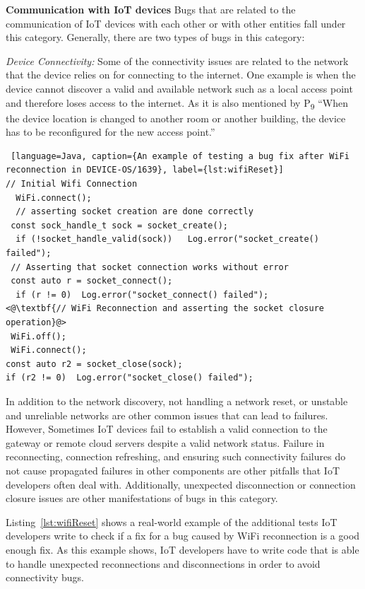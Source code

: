 \textbf{Communication with IoT devices}
Bugs that are related to the communication of IoT devices with each other or with other entities fall under this category. Generally, there are two types of bugs in this category:

\textit{Device Connectivity:} 
Some of the connectivity issues are related to the network that the device relies on for connecting to the internet. One example is when the device cannot discover a valid and available network such as a local access point and therefore loses access to the internet. As it is also mentioned by P\textsubscript{9} \enquote{When the device location is changed to another room or another building, the device has to be reconfigured for the new access point.}

\begin{lstlisting} [language=Java, caption={An example of testing a bug fix after WiFi reconnection in DEVICE-OS/1639}, label={lst:wifiReset}] 
// Initial Wifi Connection
  WiFi.connect();
  // asserting socket creation are done correctly
 const sock_handle_t sock = socket_create();
  if (!socket_handle_valid(sock))   Log.error("socket_create() failed");
 // Asserting that socket connection works without error
 const auto r = socket_connect();
  if (r != 0)  Log.error("socket_connect() failed");
<@\textbf{// WiFi Reconnection and asserting the socket closure operation}@>
 WiFi.off();
 WiFi.connect();
const auto r2 = socket_close(sock);
if (r2 != 0)  Log.error("socket_close() failed");
\end{lstlisting}

 
In addition to the network discovery, not handling a network reset, or unstable and unreliable networks are other common issues that can lead to failures. However, Sometimes IoT devices fail to establish a valid connection to the gateway or remote cloud servers despite a valid network status. Failure in reconnecting, connection refreshing, and ensuring such connectivity failures do not cause propagated failures in other components are other pitfalls that IoT developers often deal with. Additionally, unexpected disconnection or connection closure issues are other manifestations of bugs in this category.

Listing~\autoref{lst:wifiReset} shows a real-world example of the additional tests IoT developers write to check if a fix for a bug caused by WiFi reconnection is a good enough fix. As this example shows, IoT developers have to write code that is able to handle unexpected reconnections and disconnections in order to avoid connectivity bugs.

